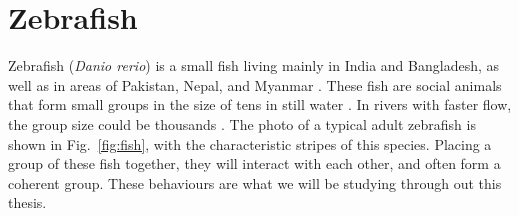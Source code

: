 \documentclass[11pt,twoside]{report}
\begin{document}


\section{Zebrafish}

Zebrafish (\emph{Danio rerio}) is a small fish living mainly in  India and Bangladesh, as well as in areas of Pakistan, Nepal, and Myanmar \cite{neff2020}. These fish are social animals that form small groups in the size of tens in still water \cite{suriyampola2016}. In rivers with faster flow, the group size could be thousands \cite{shelton2020}. The photo of a typical adult zebrafish is shown in Fig.~\ref{fig:fish}, with the characteristic stripes of this species. Placing a group of these fish together, they will interact with each other, and often form a coherent group. These behaviours are what we will be studying through out this thesis.


\end{document}
